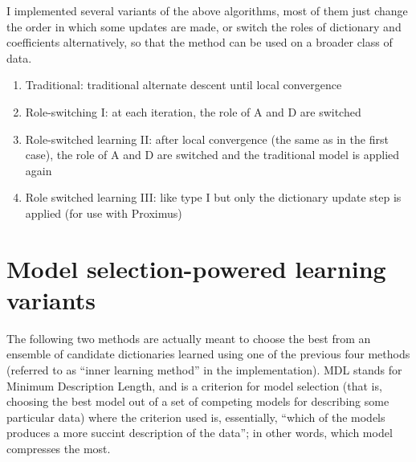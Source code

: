 \documentclass[a4paper,11pt]{article}
\begin{document}
I implemented several variants of the above algorithms, most of them just change the order in which some updates are made, or switch the roles of dictionary and coefficients alternatively, so that the method can be used on a broader class of data.
 

\begin{enumerate}
\item Traditional: traditional alternate descent until local convergence
\item Role-switching I: at each iteration, the role of A and D are switched
\item Role-switched learning II: after local convergence (the same as in the first case), the role of A and D are switched and the traditional model is applied again
\item Role switched learning III: like type I but only the dictionary update step is applied (for use with Proximus)
\end{enumerate}

\section{Model selection-powered learning variants}

The following two methods are actually meant to choose the best from an ensemble of candidate dictionaries learned using one of the previous four methods (referred to as ``inner learning method'' in the implementation). MDL stands for Minimum Description Length, and is a criterion for model selection (that is, choosing the best model out of a set of competing models for describing some particular data) where the criterion used is, essentially, ``which of the models produces a more succint description of the data''; in other words, which model compresses the most.
 
\end{document}
